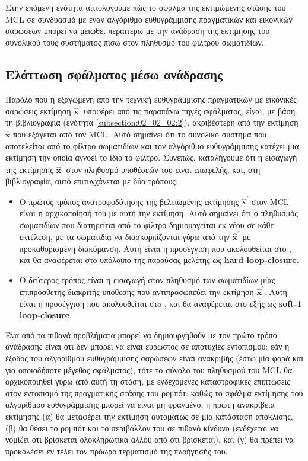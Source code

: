 Στην επόμενη ενότητα αιτιολογούμε πώς το σφάλμα της εκτιμώμενης στάσης
του MCL σε συνδυασμό με έναν αλγόριθμο ευθυγράμμισης πραγματικών και εικονικών
σαρώσεων μπορεί να μειωθεί περαιτέρω με την ανάδραση της εκτίμησης του
συνολικού τους συστήματος πίσω στον πληθυσμό του φίλτρου σωματιδίων.


\subsection{Ελάττωση σφάλματος μέσω ανάδρασης}

Παρόλο που η εξαγώμενη από την τεχνική ευθυγράμμισης πραγματικών με εικονικές
σαρώσεις εκτίμηση $\hat{\bm{x}}^{\prime}$ υποφέρει από τις παραπάνω πηγές
σφάλματος, είναι, με βάση τη βιβλιογραφία (ενότητα
\ref{subsection:02_02_02:2}), ακριβέστερη από την εκτίμηση
$\bm{\hat{x}}$ που εξάγεται από τον MCL. Αυτό σημαίνει ότι το συνολικό σύστημα
που αποτελείται από το φίλτρο σωματιδίων και τον αλγόριθμο ευθυγράμμισης
κατέχει μια εκτίμηση την οποία αγνοεί το ίδιο το φίλτρο. Συνεπώς, καταλήγουμε
ότι η εισαγωγή της εκτίμησης $\hat{\bm{x}}^{\prime}$ στον πληθυσμό υποθέσεών
του είναι επωφελής, και, στη βιβλιογραφία, αυτό επιτυγχάνεται με δύο τρόπους:

\begin{itemize}
  \item Ο πρώτος τρόπος ανατροφοδότησης της βελτιωμένης εκτίμησης
        $\hat{\bm{x}}^{\prime}$ στον MCL είναι η αρχικοποίησή του με αυτή
        την εκτίμηση. Αυτό σημαίνει ότι ο πληθυσμός σωματιδίων που διατηρείται
        από το φίλτρο δημιουργείται εκ νέου σε κάθε εκτέλεση, με τα σωματίδια
        να διασκορπίζονται γύρω από την $\hat{\bm{x}}^{\prime}$ με
        προκαθορισμένη διακύμανση. Αυτή είναι η προσέγγιση που ακολουθείται στο
        \cite{Vasiljevic2016b}, και θα αναφέρεται στο υπόλοιπο της παρούσας
        μελέτης ως \textbf{hard loop-closure}.
  \item Ο δεύτερος τρόπος είναι η εισαγωγή στον πληθυσμό των σωματιδίων μίας
        επιπρόσθετης διακριτής υπόθεσης που αντιπροσωπεύει την εκτίμηση
        $\hat{\bm{x}}^{\prime}$. Αυτή είναι η προσέγγιση που ακολουθείται στo
        \cite{Peng2018a}, και θα αναφέρεται στο εξής ως
        \textbf{soft-1 loop-closure}.
\end{itemize}

Ένα από τα πιθανά προβλήματα μπορεί να δημιουργηθούν με τον πρώτο τρόπο
ανάδρασης είναι ότι δεν μπορεί να είναι εύρωστος σε αποτυχίες εντοπισμού: εάν η
έξοδος του αλγορίθμου ευθυγράμμισης σαρώσεων είναι ανακριβής (έστω μία φορά και
για οποιοδήποτε μέγεθος σφάλματος), τότε το σύνολο του πληθυσμού του MCL θα
αρχικοποιηθεί γύρω από αυτή τη στάση, με ενδεχόμενες καταστροφικές επιπτώσεις
στον εντοπισμό της πραγματικής στάσης του ρομπότ: καθώς το σφάλμα εκτίμησης του
αλγορίθμου ευθυγράμμισης μπορεί να είναι μη φραγμένο, η πρώτη ανακρίβεια
εκτίμησης (α) θα μεταφέρει την εκτίμηση αυτομάτως σε μία κατάσταση απόκλισης,
(β) θα θέσει το ρομπότ και το περιβάλλον του σε πιθανό κίνδυνο (ενδέχεται
να νομίζει ότι βρίσκεται ολοκληρωτικά αλλού από ότι βρίσκεται), και (γ) θα
πρέπει να προκαλέσει εν τέλει τον πρόωρο τερματισμό της πλοήγησής του.

